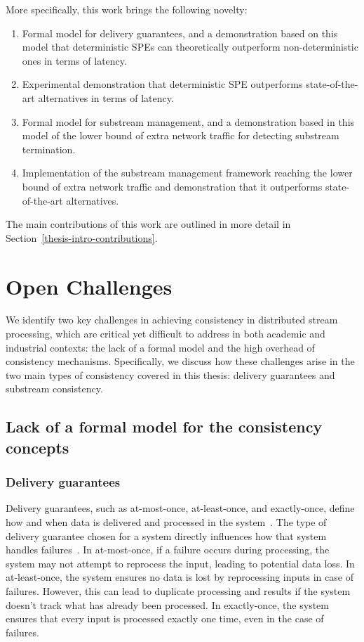More specifically, this work brings the following novelty:
\begin{enumerate}
    \item Formal model for delivery guarantees, and a demonstration based on this model that deterministic SPEs can theoretically outperform non-deterministic ones in terms of latency.
    \item Experimental demonstration that deterministic SPE outperforms state-of-the-art alternatives in terms of latency.
    \item Formal model for substream management, and a demonstration based in this model of the lower bound of extra network traffic for detecting substream termination.
    \item Implementation of the substream management framework reaching the lower bound of extra network traffic and demonstration that it outperforms state-of-the-art alternatives.
\end{enumerate}
The main contributions of this work are outlined in more detail in Section~\ref{thesis-intro-contributions}.

\section{Open Challenges}
\label{thesis-intro-challenges}

We identify two key challenges in achieving consistency in distributed stream processing, which are critical yet difficult to address in both academic and industrial contexts: the lack of a formal model and the high overhead of consistency mechanisms. Specifically, we discuss how these challenges arise in the two main types of consistency covered in this thesis: delivery guarantees and substream consistency.

\subsection{Lack of a formal model for the consistency concepts}

\subsubsection{Delivery guarantees}

Delivery guarantees, such as at-most-once, at-least-once, and exactly-once, define how and when data is delivered and processed in the system~\cite{fragkoulis2024survey, carbone2018scalable, Akidau:2013:MFS:2536222.2536229}. The type of delivery guarantee chosen for a system directly influences how that system handles failures~\cite{zhang2024survey, silvestre2021clonos, wang2021consistency}. In at-most-once, if a failure occurs during processing, the system may not attempt to reprocess the input, leading to potential data loss. In at-least-once, the system ensures no data is lost by reprocessing inputs in case of failures. However, this can lead to duplicate processing and results if the system doesn't track what has already been processed. In exactly-once, the system ensures that every input is processed exactly one time, even in the case of failures.

